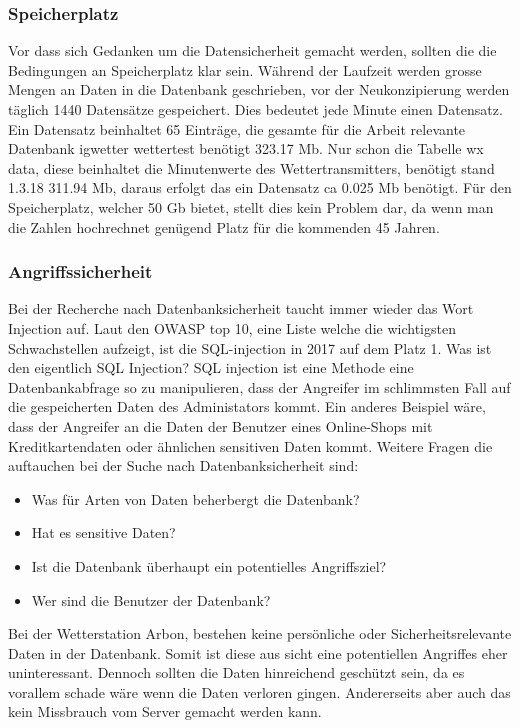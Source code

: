 \subsubsection{Speicherplatz}
Vor dass sich Gedanken um die Datensicherheit gemacht werden, sollten die die Bedingungen an Speicherplatz klar sein. Während der Laufzeit werden grosse Mengen an Daten in die Datenbank geschrieben, vor der Neukonzipierung werden täglich 1440 Datensätze gespeichert. Dies bedeutet jede Minute einen Datensatz. Ein Datensatz beinhaltet 65 Einträge, die gesamte für die Arbeit relevante Datenbank igwetter wettertest benötigt 323.17  Mb. Nur schon die Tabelle wx data, diese beinhaltet die Minutenwerte des Wettertransmitters, benötigt stand 1.3.18 311.94 Mb, daraus erfolgt das ein Datensatz ca 0.025 Mb benötigt. Für den Speicherplatz, welcher 50 Gb bietet, stellt dies kein Problem dar, da wenn man die Zahlen hochrechnet genügend Platz für die kommenden 45 Jahren.\\


\subsubsection{Angriffssicherheit}

Bei der Recherche nach Datenbanksicherheit taucht immer wieder das Wort Injection auf. Laut den OWASP top 10, eine Liste welche die wichtigsten Schwachstellen aufzeigt, ist die SQL-injection in 2017 auf dem Platz 1. Was ist den eigentlich SQL Injection? SQL injection ist eine Methode eine Datenbankabfrage so zu manipulieren, dass der Angreifer im schlimmsten Fall auf die gespeicherten Daten des Administators kommt. Ein anderes Beispiel wäre, dass der Angreifer an die Daten der Benutzer eines Online-Shops mit Kreditkartendaten oder ähnlichen sensitiven Daten kommt.
Weitere Fragen die auftauchen bei der Suche nach Datenbanksicherheit sind:
\begin{itemize}
\item Was für Arten von Daten beherbergt die Datenbank?
\item Hat es sensitive Daten?
\item Ist die Datenbank überhaupt ein potentielles Angriffsziel?
\item Wer sind die Benutzer der Datenbank?
\end{itemize}

Bei der Wetterstation Arbon, bestehen keine persönliche oder Sicherheitsrelevante Daten in der Datenbank. Somit ist diese aus sicht eine potentiellen Angriffes eher uninteressant. Dennoch sollten die Daten hinreichend geschützt sein, da es vorallem schade wäre wenn die Daten verloren gingen. Andererseits aber auch das kein Missbrauch vom Server gemacht werden kann.

